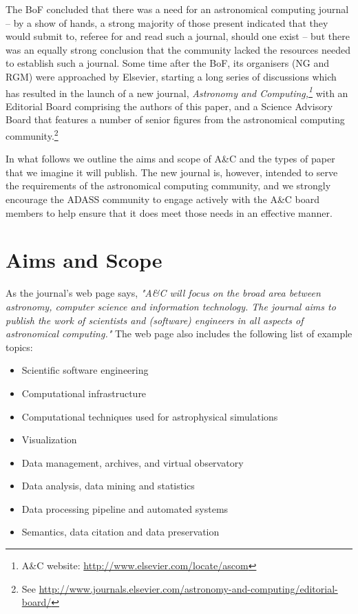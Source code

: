 The BoF concluded that there was a need for an astronomical computing journal -- by a show of hands, a strong majority of those present indicated that they would submit to, referee for and read such a journal, should one exist -- but there was an equally strong conclusion that the community lacked the resources needed to establish such a journal. Some time after the BoF, its organisers (NG and RGM) were approached by Elsevier, starting a long series of discussions which has resulted in the launch of a new journal, {\em Astronomy and Computing,\footnote{A\&C website: \url{ http://www.elsevier.com/locate/ascom}} \/} with an Editorial Board comprising the authors of this paper, and a Science Advisory Board that features a number of senior figures from the astronomical computing community.\footnote{See \url{http://www.journals.elsevier.com/astronomy-and-computing/editorial-board/}} 

In what follows we outline the aims and scope of A\&C and the types of paper that we imagine it will publish. The new journal is, however, intended to serve the requirements of the astronomical computing community, and we strongly encourage the ADASS community to engage actively with the A\&C board members to help ensure that it does meet those needs in an effective manner. 

\section{Aims and Scope}

As the journal's web page  says, {\em "A\&C will focus on the broad area between astronomy, computer science and information technology. The journal aims to publish the work of scientists and (software) engineers in all aspects of astronomical computing."\/} The web page also includes the following list of example topics:
\begin{itemize}
\setlength{\itemsep}{1pt}
  \setlength{\parskip}{0pt}
  \setlength{\parsep}{0pt}

\item Scientific software engineering

\item Computational infrastructure

\item Computational techniques used for astrophysical simulations

\item Visualization

\item Data management, archives, and virtual observatory

\item Data analysis, data mining and statistics

 \item Data processing pipeline and automated systems

\item  Semantics, data citation and data preservation


\end{itemize}


